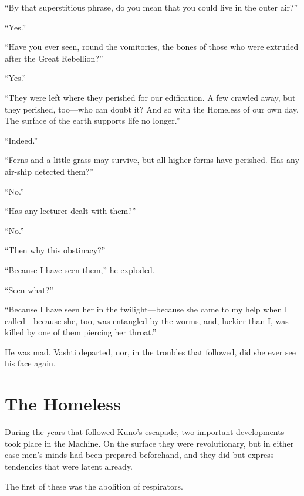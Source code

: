 ``By that superstitious phrase, do you mean that you could live in the outer air?''

``Yes.''

``Have you ever seen, round the vomitories, the bones of those who were extruded after the Great Rebellion?''

``Yes.''



``They were left where they perished for our edification. A few crawled away, but they perished, too---who can doubt it? And so with the Homeless of our own day. The surface of the earth supports life no longer.''

``Indeed.''

``Ferns and a little grass may survive, but all higher forms have perished. Has any air-ship detected them?''

``No.''

``Has any lecturer dealt with them?''

``No.''

``Then why this obstinacy?''

``Because I have seen them,'' he exploded.

``Seen what?''

``Because I have seen her in the twilight---because she came to my help when I called---because she, too, was entangled by the worms, and, luckier than I, was killed by one of them piercing her throat.''

He was mad. Vashti departed, nor, in the troubles that followed, did she ever see his face again.

\section{The Homeless}

During the years that followed Kuno's escapade, two important developments took place in the Machine. On the surface they were revolutionary, but in either case men's minds had been prepared beforehand, and they did but express tendencies that were latent already.

The first of these was the abolition of respirators.


